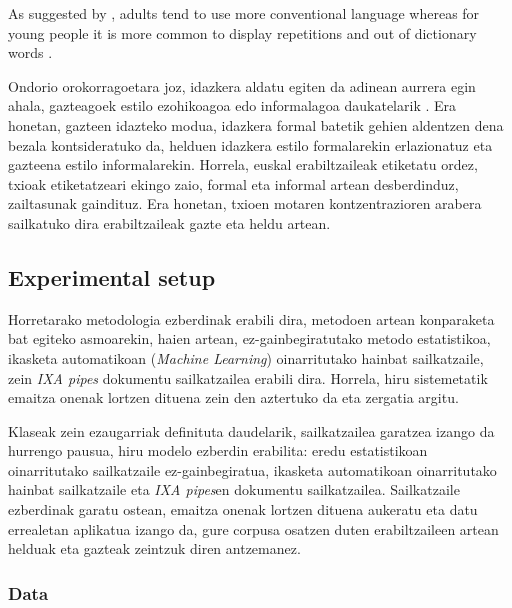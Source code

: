 \documentclass[information,article,submit,moreauthors,pdftex,10pt,a4paper]{Definitions/mdpi}
\begin{document}
As suggested by \cite{nguyen2013old}, adults tend to use more conventional language whereas for young people it is more common to display repetitions and out of dictionary words \citep{rao2010classifying,rosenthal2011age,morgan2017predicting}.

 Ondorio orokorragoetara joz, idazkera aldatu egiten da adinean aurrera egin ahala, gazteagoek estilo ezohikoagoa edo informalagoa daukatelarik \citep{nguyen2013old}. Era honetan, gazteen idazteko modua, idazkera formal batetik gehien aldentzen dena bezala kontsideratuko da, helduen idazkera estilo formalarekin erlazionatuz eta gazteena estilo informalarekin. Horrela, euskal erabiltzaileak etiketatu ordez, txioak etiketatzeari ekingo zaio, formal eta informal artean desberdinduz, zailtasunak gaindituz. Era honetan, txioen motaren kontzentrazioren arabera sailkatuko dira erabiltzaileak gazte eta heldu artean.


\subsection{Experimental setup}\label{sec:met}

Horretarako metodologia ezberdinak erabili dira, metodoen artean konparaketa bat egiteko asmoarekin, haien artean, ez-gainbegiratutako metodo estatistikoa, ikasketa automatikoan (\textit{Machine Learning}) oinarritutako hainbat sailkatzaile, zein \textit{IXA pipes} dokumentu sailkatzailea erabili dira. Horrela, hiru sistemetatik emaitza onenak lortzen dituena zein den aztertuko da eta zergatia argitu.

Klaseak zein ezaugarriak definituta daudelarik, sailkatzailea garatzea izango da hurrengo pausua, hiru modelo ezberdin erabilita: eredu estatistikoan oinarritutako sailkatzaile ez-gainbegiratua, ikasketa automatikoan oinarritutako hainbat sailkatzaile eta \textit{IXA pipes}en dokumentu sailkatzailea. Sailkatzaile ezberdinak garatu ostean, emaitza onenak lortzen dituena aukeratu eta datu errealetan aplikatua izango da, gure corpusa osatzen duten erabiltzaileen artean helduak eta gazteak zeintzuk diren antzemanez.



\subsubsection{Data} \label{sec:for inf sail}
\end{document}
